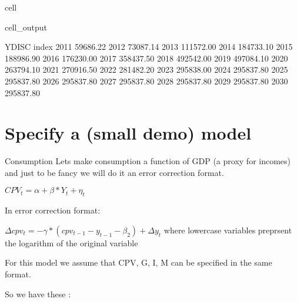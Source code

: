 \documentclass[letterpaper,10pt,english]{jupyterBook}
\begin{document}
\begin{sphinxuseclass}{cell}
\begin{sphinxVerbatimOutput}
\begin{sphinxuseclass}{cell_output}
\begin{sphinxVerbatim}[commandchars=\\\{\}]
           YDISC  
index             
2011    59686.22  
2012    73087.14  
2013   111572.00  
2014   184733.10  
2015   188986.90  
2016   176230.00  
2017   358437.50  
2018   492542.00  
2019   497084.10  
2020   263794.10  
2021   270916.50  
2022   281482.20  
2023   295838.00  
2024   295837.80  
2025   295837.80  
2026   295837.80  
2027   295837.80  
2028   295837.80  
2029   295837.80  
2030   295837.80  
\end{sphinxVerbatim}

\end{sphinxuseclass}\end{sphinxVerbatimOutput}

\end{sphinxuseclass}

\section{Specify  a (small demo) model}
\label{\detokenize{content/howto/smallmodel/modelstart:specify-a-small-demo-model}}
\sphinxAtStartPar
Consumption
Lets make consumption a function of GDP (a proxy for incomes) and just to be fancy we will do it an error correction format.

\sphinxAtStartPar
{}

\sphinxAtStartPar
\( CPV_t= \alpha + \beta * Y_t +\eta_t \)

\sphinxAtStartPar
In error correction format:

\sphinxAtStartPar
\( \Delta cpv_t = - \gamma *(cpv_{t-1}- y_{t-1} - \beta_2 ) + \Delta y_t \) where lowercase variables preprsent the logarithm of the original variable

\sphinxAtStartPar
For this model we assume that CPV, G, I, M can be specified in the same format.

\sphinxAtStartPar
So we have these :
\end{document}
